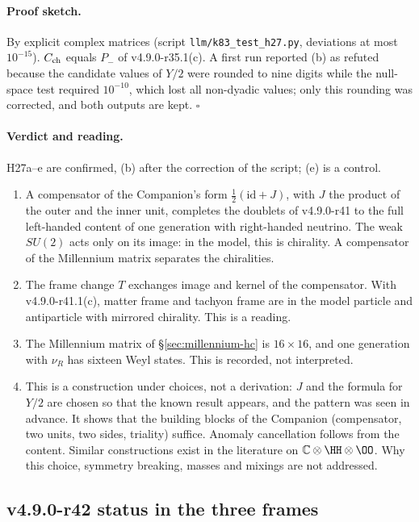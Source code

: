 \paragraph{Proof sketch.}
By explicit complex matrices (script \texttt{llm/k83\_test\_h27.py}, deviations at most \(10^{-15}\)).  \(C_{\rm ch}\) equals \(P_-\) of
v4.9.0-r35.1(c).  A first run reported (b) as refuted because the candidate values of \(Y/2\) were rounded to nine digits while the
null-space test required \(10^{-10}\), which lost all non-dyadic values; only this rounding was corrected, and both outputs are kept.
\(\square\)

\paragraph{Verdict and reading.}
H27a--e are confirmed, (b) after the correction of the script; (e) is a control.
\begin{enumerate}[leftmargin=2em]
\item A compensator of the Companion's form \(\tfrac12(\mathrm{id}+J)\), with \(J\) the product of the outer and the inner unit, completes
the doublets of v4.9.0-r41 to the full left-handed content of one generation with right-handed neutrino.  The weak \(SU(2)\) acts only
on its image: in the model, this is chirality.  A compensator of the Millennium matrix separates the chiralities.
\item The frame change \(T\) exchanges image and kernel of the compensator.  With v4.9.0-r41.1(c), matter frame and tachyon frame are in
the model particle and antiparticle with mirrored chirality.  This is a reading.
\item The Millennium matrix of \S\ref{sec:millennium-hc} is \(16\times16\), and one generation with \(\nu_R\) has sixteen Weyl states.  This is
recorded, not interpreted.
\item This is a construction under choices, not a derivation: \(J\) and the formula for \(Y/2\) are chosen so that the known result
appears, and the pattern was seen in advance.  It shows that the building blocks of the Companion (compensator, two units, two sides,
triality) suffice.  Anomaly cancellation follows from the content.  Similar constructions exist in the literature on
\(\mathbb C\otimes\HH\otimes\OO\).  Why this choice, symmetry breaking, masses and mixings are not addressed.
\end{enumerate}

\subsection*{v4.9.0-r42 status in the three frames}
\label{subsec:v490-r42-frames}

